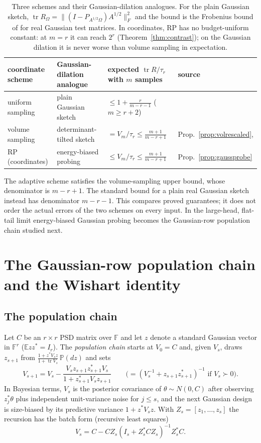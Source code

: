 \documentclass[11pt,a4paper]{article}
\theoremstyle{definition}
\newcommand{\E}{\mathbb{E}}
\newcommand{\PP}{\mathbb{P}}
\newcommand{\F}{\mathbb{F}}
\newcommand{\tr}{\operatorname{tr}}
\begin{document}
\begin{table}[h]
\centering\small
\begin{tabular}{@{}llll@{}}
\toprule
coordinate scheme & Gaussian-dilation analogue & expected $\tr R/\tau_r$ with $m$ samples & source\\
\midrule
uniform sampling & plain Gaussian sketch & $\le1+\frac r{m-r-1}$ ($m\ge r+2$) & \cite[Thm.~10.5]{HMT}\\
volume sampling & determinant-tilted sketch & $=V_m/\tau_r\le\frac{m+1}{m-r+1}$ & Prop.~\ref{prop:volrescaled}, \cite{GS}\\
RP (coordinates) & energy-biased probing & $\le V_m/\tau_r\le\frac{m+1}{m-r+1}$ & Prop.~\ref{prop:gaussprobe}\\
\bottomrule
\end{tabular}
\caption{Three schemes and their Gaussian-dilation analogues. For the plain Gaussian sketch, $\tr R_\Omega=\|(I-P_{A^{1/2}\Omega})A^{1/2}\|_F^2$ and the bound is the Frobenius bound of \cite{HMT} for real Gaussian test matrices. In coordinates, RP has no budget-uniform constant: at $m=r$ it can reach $2^r$ (Theorem~\ref{thm:contrast}); on the Gaussian dilation it is never worse than volume sampling in expectation.}
\label{tab:triad}
\end{table}

The adaptive scheme satisfies the volume-sampling upper bound, whose denominator is $m-r+1$. The standard bound for a plain real Gaussian sketch instead has denominator $m-r-1$. This compares proved guarantees; it does not order the actual errors of the two schemes on every input. In the large-head, flat-tail limit energy-biased Gaussian probing becomes the Gaussian-row population chain studied next.
\section{The Gaussian-row population chain and the Wishart identity}\label{sec:population}

\subsection{The population chain}
Let $C$ be an $r\times r$ PSD matrix over $\F$ and let $z$ denote a standard Gaussian vector in $\F^r$ ($\E zz^*=I_r$). The \emph{population chain} starts at $V_0=C$ and, given $V_s$, draws $z_{s+1}$ from $\frac{1+z^*V_sz}{1+\tr V_s}\,\PP(dz)$ and sets
\[
V_{s+1}=V_s-\frac{V_sz_{s+1}z_{s+1}^*V_s}{1+z_{s+1}^*V_sz_{s+1}}\qquad\big(=(V_s^{-1}+z_{s+1}z_{s+1}^*)^{-1}\text{ if }V_s\succ0\big).
\]
In Bayesian terms, $V_s$ is the posterior covariance of $\theta\sim N(0,C)$ after observing $z_j^*\theta$ plus independent unit-variance noise for $j\le s$, and the next Gaussian design is size-biased by its predictive variance $1+z^*V_sz$. With $Z_s=[z_1,\dots,z_s]$ the recursion has the batch form (recursive least squares)
\begin{equation}\label{eq:popbatch}
V_s=C-CZ_s(I_s+Z_s^*CZ_s)^{-1}Z_s^*C .
\end{equation}
\end{document}
